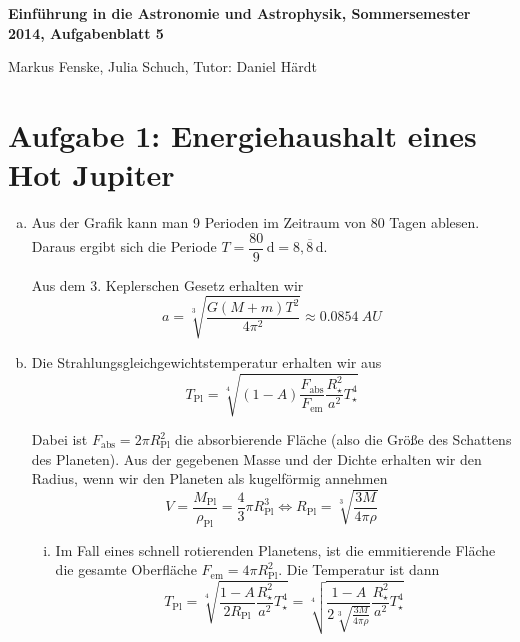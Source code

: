 \documentclass[a4paper,german,12pt,smallheadings]{scrartcl}
\begin{document}
\allowdisplaybreaks %
\begin{center}
\bfseries %
\sffamily %
\vspace{-40pt}
Einführung in die Astronomie und Astrophysik, Sommersemester 2014, Aufgabenblatt 5

Markus Fenske, Julia Schuch, Tutor: Daniel Härdt
\vspace{-10pt}
\end{center}
\section*{Aufgabe 1: Energiehaushalt eines Hot Jupiter}
\begin{enumerate}[a)]
  \item
    Aus der Grafik kann man 9 Perioden im Zeitraum von 80 Tagen ablesen. Daraus
    ergibt sich die Periode $T = \dfrac{80}{9}\,\mathrm{d} = 8{,}\overline{8}\,\mathrm{d}$.

    Aus dem 3. Keplerschen Gesetz erhalten wir
    \begin{equation}
      a = \sqrt[3]{
        \frac{G(M+m)T^2}{4 \pi^2}
      } \approx \SI{0.0854}{AU}
    \end{equation}
  \item
    Die Strahlungsgleichgewichtstemperatur erhalten wir aus
    \begin{equation}
      T_\text{Pl} = \sqrt[4]{
        (1-A) \frac{F_\text{abs}}{F_\text{em}} \frac{R_\star^2}{a^2} T_\star^4
      }
    \end{equation}

    Dabei ist $F_\text{abs} = 2 \pi R_\text{Pl}^2$ die absorbierende Fläche (also
    die Größe des Schattens des Planeten). Aus der gegebenen Masse und der
    Dichte erhalten wir den Radius, wenn wir den Planeten als kugelförmig
    annehmen
    \begin{equation}
     V = \frac{M_\text{Pl}}{\rho_\text{Pl}} = \frac{4}{3} \pi R_\text{Pl}^3
     \Leftrightarrow R_\text{Pl} = \sqrt[3]{\frac{3M}{4\pi \rho}}
    \end{equation}

    \begin{enumerate}[(i)]
      \item
        Im Fall eines schnell rotierenden Planetens, ist die emmitierende
        Fläche die gesamte Oberfläche $F_\text{em} = 4 \pi R_\text{Pl}^2$. Die
        Temperatur ist dann
        \begin{equation}
          T_\text{Pl} = \sqrt[4]{
            \frac{1-A}{2 R_\text{Pl}} \frac{R_\star^2}{a^2} T_\star^4
          } = \sqrt[4]{
            \frac{1-A}{
              2 \sqrt[3]{\frac{3M}{4 \pi \rho}}
            } \frac{R_\star^2}{a^2} T_\star^4
          }
        \end{equation}

    \end{enumerate}
\end{enumerate}
\end{document}
